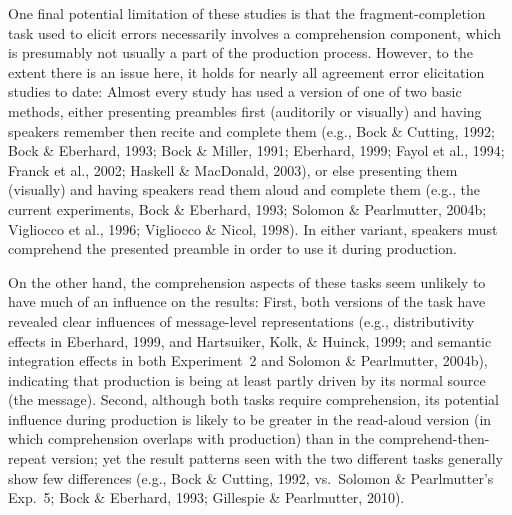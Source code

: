 \documentclass[12pt,titlepage]{article}
\newcommand{\NOTE}[1]{\textbf{*** #1 ***}}  %
\newcommand{\IGNORE}[1]{} %
\begin{document}
\IGNORE{

f-p handled 3 processes: getting num info from head to phrase (w/in phrase)
--- provided by independent processes; moving num info between different
phrases when appropriate (subj to VP) --- provided by WM; and preventing
num info from moving between phrases when appropriate (mostly) --- handled 
by weighting based on scope/activation

}\IGNORE{---no hierarchical feat-passing, actually mem-encoding; but still
might need mem retrieval too (what effects?  -- maybe length?), and also
need conceptual (marking) aspect to handle\ldots \NOTE{length effect deals
with this a bit (but we don't discuss length effect anywhere except below)}

}\IGNORE{---more on mem-encoding?}

\IGNORE{\subsection{Comprehension in Production Tasks}}

One final potential limitation of these studies is that the
fragment-completion task used to elicit errors necessarily involves a
comprehension component, which is presumably not usually a part of the
production process.  However, to the extent there is an issue here, it
holds for nearly all agreement error elicitation studies to date: Almost
every study has used a version of one of two basic methods, either
presenting preambles first (auditorily or visually) and having speakers
remember then recite and complete them (e.g., Bock \& Cutting, 1992; Bock
\& Eberhard, 1993; Bock \& Miller, 1991; Eberhard, 1999; Fayol et al.,
1994; Franck et al., 2002; Haskell \& MacDonald, 2003), or else presenting
them (visually) and having speakers read them aloud and complete them
(e.g., the current experiments, Bock \& Eberhard, 1993; Solomon \&
Pearlmutter, 2004b; Vigliocco et al., 1996; Vigliocco \& Nicol, 1998).  In
either variant, speakers must comprehend the presented preamble in order to
use it during production.

On the other hand, the comprehension aspects of these tasks seem unlikely
to have much of an influence on the results: First, both versions of the
task have revealed clear influences of message-level representations (e.g.,
distributivity effects in Eberhard, 1999, and Hartsuiker, Kolk, \& Huinck,
1999; and semantic integration effects in both Experiment~2 and Solomon \&
Pearlmutter, 2004b), indicating that production is being at least partly
driven by its normal source (the message).  Second, although both tasks
require comprehension, its potential influence during production is likely
to be greater in the read-aloud version (in which comprehension overlaps
with production) than in the comprehend-then-repeat version; yet the result
patterns seen with the two different tasks generally show few differences
(e.g., Bock \& Cutting, 1992, vs.\ Solomon \& Pearlmutter's Exp.~5; Bock \&
Eberhard, 1993; Gillespie \& Pearlmutter, 2010).
\end{document}
